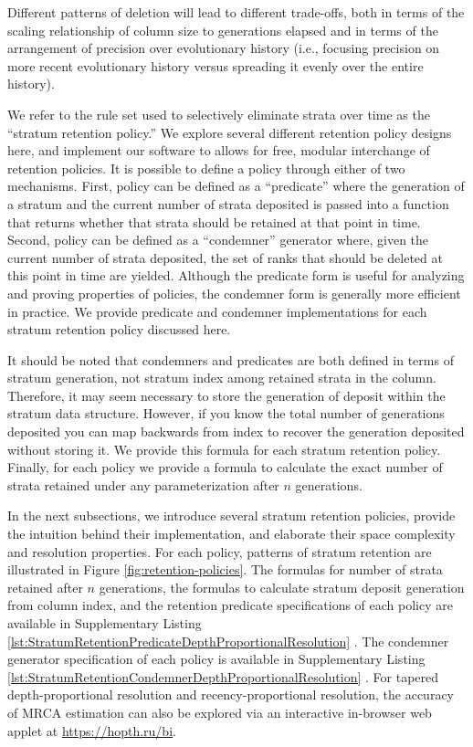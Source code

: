 Different patterns of deletion will lead to different trade-offs, both in terms of the scaling relationship of column size to generations elapsed and in terms of the arrangement of precision over evolutionary history (i.e., focusing precision on more recent evolutionary history versus spreading it evenly over the entire history).

We refer to the rule set used to selectively eliminate strata over time as the ``stratum retention policy.''
We explore several different retention policy designs here, and implement our software to allows for free, modular interchange of retention policies.
It is possible to define a policy through either of two mechanisms.
First, policy can be defined as a ``predicate'' where the generation of a stratum and the current number of strata deposited is passed into a function that returns whether that strata should be retained at that point in time.
Second, policy can be defined as a ``condemner'' generator where, given the current number of strata deposited, the set of ranks that should be deleted at this point in time are yielded.
Although the predicate form is useful for analyzing and proving properties of policies, the condemner form is generally more efficient in practice.
We provide predicate and condemner implementations for each stratum retention policy discussed here.

It should be noted that condemners and predicates are both defined in terms of stratum generation, not stratum index among retained strata in the column.
Therefore, it may seem necessary to store the generation of deposit within the stratum data structure.
However, if you know the total number of generations deposited you can map backwards from index to recover the generation deposited without storing it.
We provide this formula for each stratum retention policy.
Finally, for each policy we provide a formula to calculate the exact number of strata retained under any parameterization after $n$ generations.

In the next subsections, we introduce several stratum retention policies, provide the intuition behind their implementation, and elaborate their space complexity and resolution properties.
For each policy, patterns of stratum retention are illustrated in Figure \ref{fig:retention-policies}.
The formulas for number of strata retained after $n$ generations, the formulas to calculate stratum deposit generation from column index, and the retention predicate specifications of each policy are available in Supplementary Listing \ref{lst:StratumRetentionPredicateDepthProportionalResolution} \citep{moreno2022hstratconceptsupplement}.
The condemner generator specification of each policy is available in Supplementary Listing \ref{lst:StratumRetentionCondemnerDepthProportionalResolution} \citep{moreno2022hstratconceptsupplement}.
For tapered depth-proportional resolution and recency-proportional resolution, the accuracy of MRCA estimation can also be explored via an interactive in-browser web applet at \url{https://hopth.ru/bi}.

